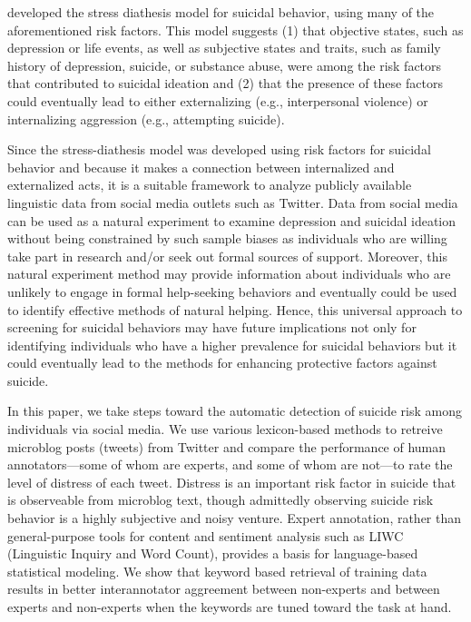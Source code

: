 \documentclass[11pt]{article}
\begin{document}
 developed the stress diathesis model for suicidal behavior, using many of the aforementioned risk factors.  This model suggests (1) that objective states, such as depression or life events, as well as subjective states and traits, such as family history of depression, suicide, or substance abuse, were among the risk factors that contributed to suicidal ideation and (2) that the presence of these factors could eventually lead to either externalizing (e.g., interpersonal violence) or internalizing aggression (e.g., attempting suicide).

	Since the stress-diathesis model was developed using risk factors for suicidal behavior and because it makes a connection between internalized and externalized acts, it is a suitable framework to analyze publicly available linguistic data from social media outlets such as Twitter. Data from social media can be used as a natural experiment to examine depression and suicidal ideation without being constrained by such sample biases as individuals who are willing take part in research and/or seek out formal sources of support. Moreover, this natural experiment method may provide information about individuals who are unlikely to engage in formal help-seeking behaviors and eventually could be used to identify effective methods of natural helping. Hence, this universal approach to screening for suicidal behaviors may have future implications not only for identifying individuals who have a higher prevalence for suicidal behaviors but it could eventually lead to the methods for enhancing protective factors against suicide.  

In this paper, we take steps toward the automatic detection of suicide risk among individuals via social media. We use various lexicon-based methods to retreive microblog posts (tweets) from Twitter and compare the performance of human annotators---some of
whom are experts, and some of whom are not---to rate the level of distress of each tweet. Distress is an important risk factor in suicide that is observeable from microblog text, though admittedly observing suicide risk behavior is a highly subjective and noisy venture.  Expert annotation, rather than general-purpose tools for content and sentiment analysis such as LIWC (Linguistic Inquiry and Word Count), provides a basis for language-based statistical modeling.
We show that keyword based retrieval of training data results in better interannotator aggreement between non-experts and between experts and non-experts when the keywords are tuned toward the task at hand.
\end{document}
